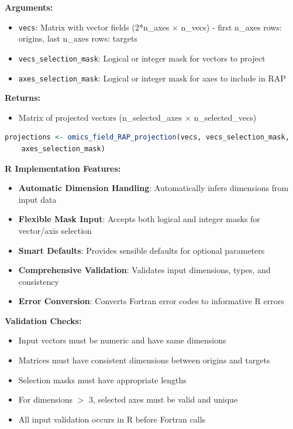 \documentclass[11pt]{article}
\begin{document}
\begin{enumerate}
    \textbf{Arguments:}
    \begin{itemize}
        \item \texttt{vecs}: Matrix with vector fields (2*n\_axes × n\_vecs) - first n\_axes rows: origins, last n\_axes rows: targets
        \item \texttt{vecs\_selection\_mask}: Logical or integer mask for vectors to project
        \item \texttt{axes\_selection\_mask}: Logical or integer mask for axes to include in RAP
    \end{itemize}
    \textbf{Returns:}
    \begin{itemize}
        \item Matrix of projected vectors (n\_selected\_axes × n\_selected\_vecs)
    \end{itemize}
\begin{lstlisting}[language=R, caption={Vector Field RAP Projection}]
projections <- omics_field_RAP_projection(vecs, vecs_selection_mask, 
    axes_selection_mask)
\end{lstlisting}

\end{enumerate}

\textbf{R Implementation Features:}
\begin{itemize}
    \item \textbf{Automatic Dimension Handling}: Automatically infers dimensions from input data
    \item \textbf{Flexible Mask Input}: Accepts both logical and integer masks for vector/axis selection
    \item \textbf{Smart Defaults}: Provides sensible defaults for optional parameters
    \item \textbf{Comprehensive Validation}: Validates input dimensions, types, and consistency
    \item \textbf{Error Conversion}: Converts Fortran error codes to informative R errors
\end{itemize}

\textbf{Validation Checks:}
\begin{itemize}
    \item Input vectors must be numeric and have same dimensions
    \item Matrices must have consistent dimensions between origins and targets
    \item Selection masks must have appropriate lengths
    \item For dimensions $>$ 3, selected axes must be valid and unique
    \item All input validation occurs in R before Fortran calls
\end{itemize}
\end{document}

